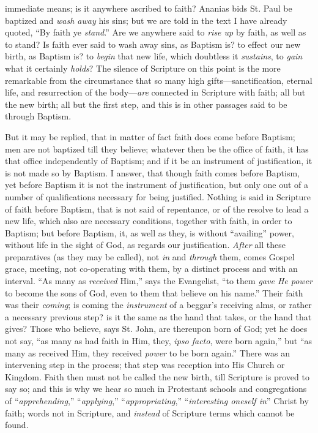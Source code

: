 immediate means; is it anywhere ascribed to faith? Ananias bids St.
Paul be baptized and \emph{wash away} his sins; but we are told in the
text I have already quoted, ``By faith ye \emph{stand}.'' Are
we anywhere said to \emph{rise up} by faith, as well as to stand? Is
faith ever said to wash away sins, as Baptism is? to effect our new
birth, as Baptism is? to \emph{begin} that new life, which doubtless
it \emph{sustains}, to \emph{gain} what it certainly \emph{holds}? The
silence of Scripture on this point is the more remarkable from the
circumstance that so many high gifts—sanctification, eternal life,
and resurrection of the body—\emph{are} connected in Scripture with
faith; all but the new birth; all but the first step, and this is in
other passages said to be through Baptism.

But it may be replied, that in matter of fact faith does come
before Baptism; men are not baptized till they believe; whatever then
be the office of faith, it has that office independently of
Baptism; and if it be an instrument of justification, it is not made
so by Baptism. I answer, that though faith comes before Baptism, yet
before Baptism it is not the instrument of justification, but only one
out of a number of qualifications necessary for being justified.
Nothing is said in Scripture of faith before Baptism, that is not said
of repentance, or of the resolve to lead a new life, which also are
necessary conditions, together with faith, in order to Baptism; but
before Baptism, it, as well as they, is without ``availing''
power, without life in the sight of God, as regards our justification.
\emph{After} all these preparatives (as they may be called), not \emph{in}
and \emph{through} them, comes Gospel grace, meeting, not co-operating
with them, by a distinct process and with an interval. ``As many
as \emph{received} Him,'' says the Evangelist, ``to them \emph{gave
He power} to become the sons of God, even to them that believe on
his name.'' Their faith was their \emph{coming}; is coming the \emph{instrument}
of a beggar's receiving alms, or rather a necessary previous step? is
it the same as the hand that takes, or the hand that gives? Those who
believe, says St. John, are thereupon born of God; yet he does not
say, ``as many as had faith in Him, they, \emph{ipso facto}, were
born again,'' but ``as many as received Him, they received \emph{power}
to be born again.'' There was an intervening step in the process;
that step was reception into His Church or Kingdom. Faith then must
not be called the new birth, till Scripture is proved to say so; and
this is why we hear so much in Protestant schools and congregations of
``\emph{apprehending},'' ``\emph{applying},'' ``\emph{appropriating},''
``\emph{interesting oneself in}'' Christ by faith; words not
in Scripture, and \emph{instead} of Scripture terms which cannot
be found.

